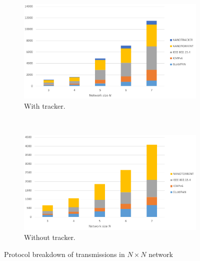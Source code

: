 \begin{figure}
	\centering
	\begin{subfigure}[b]{\textwidth}
		\centering
		\includegraphics[width=\linewidth]{graphs/scale/transmissions-tracker.pdf}
		\caption{With tracker.}
		\label{fig:eval:scale:transmissions:tracker}
	\end{subfigure}%
	\\
	\begin{subfigure}[b]{\textwidth}
		\centering
		\includegraphics[width=\linewidth]{graphs/scale/transmissions-no-tracker.pdf}
		\caption{Without tracker.}
		\label{fig:eval:scale:transmissions:no-tracker}
	\end{subfigure}
	\caption{Protocol breakdown of transmissions in $N \times N$ network}
	\label{fig:eval:scale:transmissions}
\end{figure}

